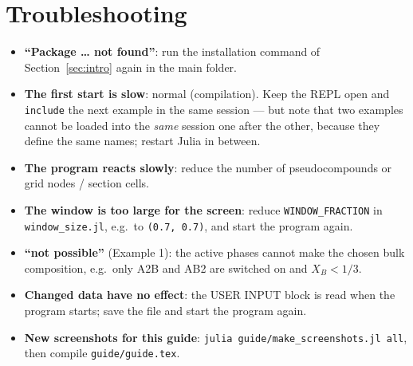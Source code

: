 \documentclass[11pt,a4paper]{article}
\newcommand{\file}[1]{\texttt{#1}}
\begin{document}
\section{Troubleshooting}
\begin{itemize}
\item \textbf{``Package … not found''}: run the installation command of Section~\ref{sec:intro} again in the
  main folder.
\item \textbf{The first start is slow}: normal (compilation). Keep the REPL open and \lstinline{include} the next
  example in the same session — but note that two examples cannot be loaded into the \emph{same} session one
  after the other, because they define the same names; restart Julia in between.
\item \textbf{The program reacts slowly}: reduce the number of pseudocompounds or grid nodes / section cells.
\item \textbf{The window is too large for the screen}: reduce \lstinline{WINDOW_FRACTION} in
  \file{window\_size.jl}, e.g.\ to \lstinline{(0.7, 0.7)}, and start the program again.
\item \textbf{``not possible''} (Example 1): the active phases cannot make the chosen bulk composition, e.g.\ only
  A2B and AB2 are switched on and $X_B < 1/3$.
\item \textbf{Changed data have no effect}: the USER INPUT block is read when the program starts; save the file
  and start the program again.
\item \textbf{New screenshots for this guide}: \lstinline{julia guide/make_screenshots.jl all}, then compile
  \file{guide/guide.tex}.
\end{itemize}
\end{document}
